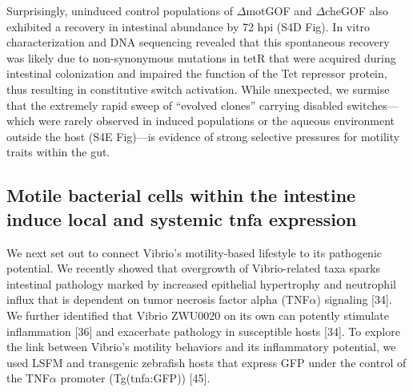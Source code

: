 Surprisingly, uninduced control populations of $\Delta$motGOF and $\Delta$cheGOF also exhibited a recovery in intestinal abundance by 72 hpi (S4D Fig). In vitro characterization and DNA sequencing revealed that this spontaneous recovery was likely due to non-synonymous mutations in tetR that were acquired during intestinal colonization and impaired the function of the Tet repressor protein, thus resulting in constitutive switch activation. While unexpected, we surmise that the extremely rapid sweep of ``evolved clones'' carrying disabled switches—which were rarely observed in induced populations or the aqueous environment outside the host (S4E Fig)—is evidence of strong selective pressures for motility traits within the gut. 


\subsection{Motile bacterial cells within the intestine induce local and systemic tnfa expression}
We next set out to connect Vibrio's motility-based lifestyle to its pathogenic potential. We recently showed that overgrowth of Vibrio-related taxa sparks intestinal pathology marked by increased epithelial hypertrophy and neutrophil influx that is dependent on tumor necrosis factor alpha (TNF$\alpha$) signaling [34]. We further identified that Vibrio ZWU0020 on its own can potently stimulate inflammation [36] and exacerbate pathology in susceptible hosts [34]. To explore the link between Vibrio's motility behaviors and its inflammatory potential, we used LSFM and transgenic zebrafish hosts that express GFP under the control of the TNF$\alpha$ promoter (Tg(tnfa:GFP)) [45]. 

